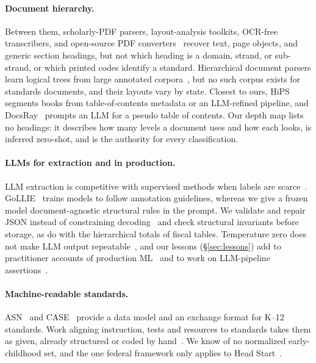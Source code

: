 \documentclass[11pt]{article}
\begin{document}
\paragraph{Document hierarchy.} Between them, scholarly-PDF parsers,
layout-analysis toolkits, OCR-free transcribers, and open-source PDF
converters~\citep{lopez2009grobid,shen2021layoutparser,blecher2024nougat,auer2024docling,wang2024mineru}
recover text, page objects, and generic section headings, but not which
heading is a domain, strand, or sub-strand, or which printed codes identify a
standard. Hierarchical document parsers learn logical trees from large annotated
corpora~\citep{ma2023hrdoc,wang2024detect,xing2024dochienet}, but no such
corpus exists for standards documents, and their layouts vary by state.
Closest to ours, HiPS~\citep{wehnert2025hips} segments books from
table-of-contents metadata or an LLM-refined pipeline, and DocsRay~\citep{jeong2025docsray} prompts an LLM for a pseudo
table of contents.
Our depth map lists no headings: it describes how many levels a document uses
and how each looks, is inferred zero-shot, and is the authority for every
classification.

\paragraph{LLMs for extraction and in production.} LLM extraction is
competitive with supervised methods when labels are
scarce~\citep{agrawal2022large,xu2024large}. GoLLIE~\citep{sainz2024gollie}
trains models to follow annotation guidelines, whereas we give a frozen model
document-agnostic structural rules in the prompt. We validate and repair JSON
instead of constraining decoding~\citep{willard2023efficient,tam2024speak} and check
structural invariants before storage, as \citet{aggarwal2025fiscal} do with
the hierarchical totals of fiscal tables. Temperature zero does not make LLM
output repeatable~\citep{ouyang2025nondeterminism,atil2025nondeterminism}, and
our lessons (\S\ref{sec:lessons}) add to practitioner accounts of production
ML~\citep{shankar2024operationalize} and to work on LLM-pipeline
assertions~\citep{shankar2024spade}.

\paragraph{Machine-readable standards.} ASN~\citep{sutton2008achievement} and
CASE~\citep{1edtech2017case} provide a data model and an exchange format for
K--12 standards. Work aligning instruction, tests and resources to standards
takes them as given, already structured or coded by
hand~\citep{porter2002measuring,polikoff2011howwell,devaul2011computer,xu2025automated}.
We know of no normalized early-childhood set, and the one federal framework
only applies to Head Start~\citep{ohs2015elof}.
\end{document}
